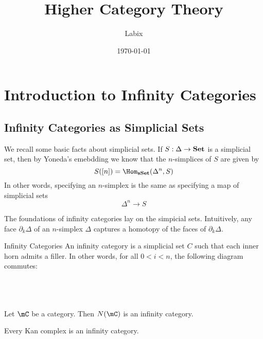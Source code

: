 \documentclass[a4paper]{article}
\title{Higher Category Theory}
\author{Labix}
\date{\today}
\begin{document}
\maketitle
\begin{abstract}
\begin{itemize}
\end{itemize}
\end{abstract}
\pagebreak
\tableofcontents

\pagebreak
\section{Introduction to Infinity Categories}
\subsection{Infinity Categories as Simplicial Sets}
We recall some basic facts about simplicial sets. If $S:\Delta\to\bold{Set}$ is a simplicial set, then by Yoneda's emebdding we know that the $n$-simplices of $S$ are given by $$S([n])=\Hom_\bold{sSet}(\Delta^n,S)$$ In other words, specifying an $n$-simplex is the same as specifying a map of simplicial sets $$\Delta^n\to S$$

The foundations of infinity categories lay on the simpicial sets. Intuitively, any face $\partial_k\Delta$ of an $n$-simplex $\Delta$ captures a homotopy of the faces of $\partial_k\Delta$. 

\begin{defn}{Infinity Categories}{} An infinity category is a simplicial set $C$ such that each inner horn admits a filler. In other words, for all $0<i<n$, the following diagram commutes: \\~\\
\\~\\
\end{defn}

\begin{lmm}{}{} Let $\mC$ be a category. Then $N(\mC)$ is an infinity category. 
\end{lmm}

\begin{lmm}{}{} Every Kan complex is an infinity category. 
\end{lmm}
\end{document}
